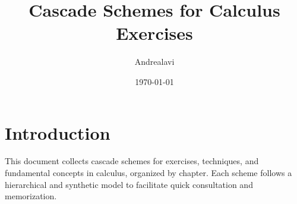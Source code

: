 \documentclass[11pt,a4paper]{article}
\title{Cascade Schemes for Calculus Exercises}
\author{Andrealavi}
\date{\today}
\begin{document}
\maketitle
\clearpage
\tableofcontents
\newpage

\section*{Introduction}
This document collects cascade schemes for exercises, techniques, and fundamental concepts in calculus, organized by chapter. Each scheme follows a hierarchical and synthetic model to facilitate quick consultation and memorization.




\end{document}
